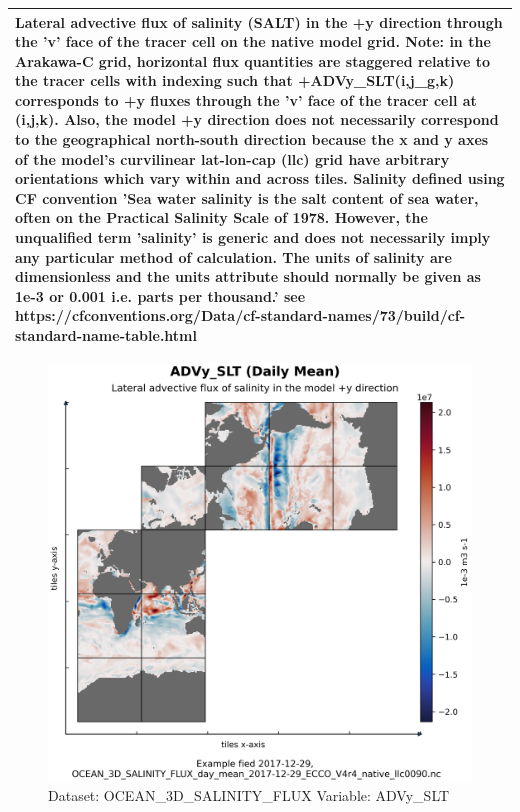 \begin{longtable}{|p{}|p{}|p{}|p{}|}
\multicolumn{4}{|p{1\textwidth}|}{Lateral advective flux of salinity (SALT) in the +y direction through the 'v' face of the tracer cell on the native model grid. Note: in the Arakawa-C grid, horizontal flux quantities are staggered relative to the tracer cells with indexing such that +ADVy\_SLT(i,j\_g,k) corresponds to +y fluxes through the 'v' face of the tracer cell at (i,j,k). Also, the model +y direction does not necessarily correspond to the geographical north-south direction because the x and y axes of the model's curvilinear lat-lon-cap (llc) grid have arbitrary orientations which vary within and across tiles. Salinity defined using CF convention 'Sea water salinity is the salt content of sea water, often on the Practical Salinity Scale of 1978. However, the unqualified term 'salinity' is generic and does not necessarily imply any particular method of calculation. The units of salinity are dimensionless and the units attribute should normally be given as 1e-3 or 0.001 i.e. parts per thousand.' see https://cfconventions.org/Data/cf-standard-names/73/build/cf-standard-name-table.html} \\ \hline
\end{longtable}

\begin{figure}[H]
\centering
\includegraphics[width=\textwidth]{../images/plots/native_plots/Ocean_Three-Dimensional_Salinity_Fluxes/ADVy_SLT.png}
\caption{Dataset: OCEAN\_3D\_SALINITY\_FLUX Variable: ADVy\_SLT}
\label{tab:table-OCEAN_3D_SALINITY_FLUX_ADVy_SLT-Plot}
\end{figure}
\pagebreak
